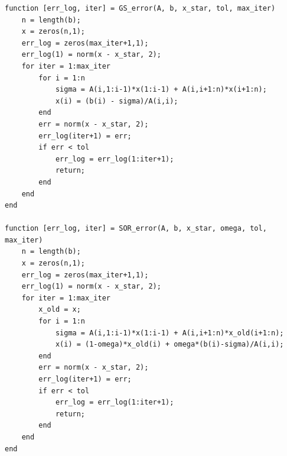 \documentclass[12pt,a4paper]{ctexart}
\begin{document}
\begin{lstlisting}
function [err_log, iter] = GS_error(A, b, x_star, tol, max_iter)
    n = length(b);
    x = zeros(n,1);
    err_log = zeros(max_iter+1,1);
    err_log(1) = norm(x - x_star, 2);
    for iter = 1:max_iter
        for i = 1:n
            sigma = A(i,1:i-1)*x(1:i-1) + A(i,i+1:n)*x(i+1:n);
            x(i) = (b(i) - sigma)/A(i,i);
        end
        err = norm(x - x_star, 2);
        err_log(iter+1) = err;
        if err < tol
            err_log = err_log(1:iter+1);
            return;
        end
    end
end

function [err_log, iter] = SOR_error(A, b, x_star, omega, tol, max_iter)
    n = length(b);
    x = zeros(n,1);
    err_log = zeros(max_iter+1,1);
    err_log(1) = norm(x - x_star, 2);
    for iter = 1:max_iter
        x_old = x;
        for i = 1:n
            sigma = A(i,1:i-1)*x(1:i-1) + A(i,i+1:n)*x_old(i+1:n);
            x(i) = (1-omega)*x_old(i) + omega*(b(i)-sigma)/A(i,i);
        end
        err = norm(x - x_star, 2);
        err_log(iter+1) = err;
        if err < tol
            err_log = err_log(1:iter+1);
            return;
        end
    end
end
\end{lstlisting}
\end{document}
